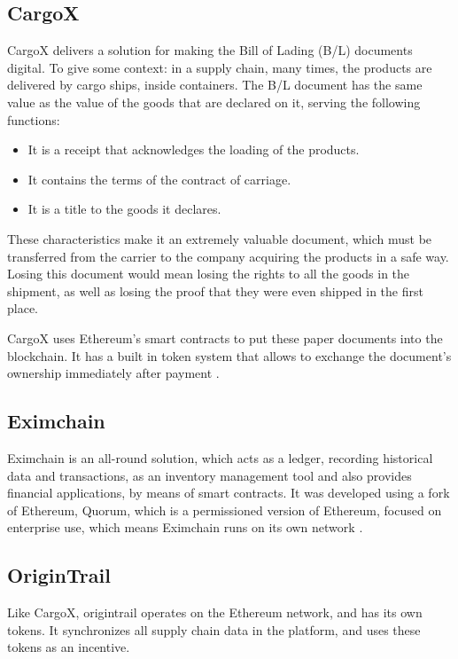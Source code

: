 \subsection{CargoX}
CargoX delivers a solution for making the Bill of Lading (B/L) documents digital.  To give some context: in a supply chain, many times, the products are delivered by cargo ships, inside containers. The B/L document has the same value as the value of the goods that are declared on it, serving the following functions:
\begin{itemize}
\item It is a receipt that acknowledges the loading of the products.
\item It contains the terms of the contract of carriage.
\item It is a title to the goods it declares.
\end{itemize}
These characteristics make it an extremely valuable document, which must be transferred from the carrier to the company acquiring the products in a safe way. Losing this document would mean losing the rights to all the goods in the shipment, as well as losing the proof that they were even shipped in the first place.

CargoX uses Ethereum's smart contracts to put these paper documents into the blockchain. It has a built in token system that allows to exchange the document's ownership immediately after payment \cite{CargoX2017}.

\subsection{Eximchain}
Eximchain is an all-round solution, which acts as a ledger, recording historical data and transactions, as an inventory management tool and also provides financial applications, by means of smart contracts. It was developed using a fork of Ethereum, Quorum, which is a permissioned version of Ethereum, focused on enterprise use, which means Eximchain runs on its own network \cite{Huertas2017}.

\subsection{OriginTrail}
Like CargoX, origintrail operates on the Ethereum network, and has its own tokens. It synchronizes all supply chain data in the platform, and uses these tokens as an incentive.

